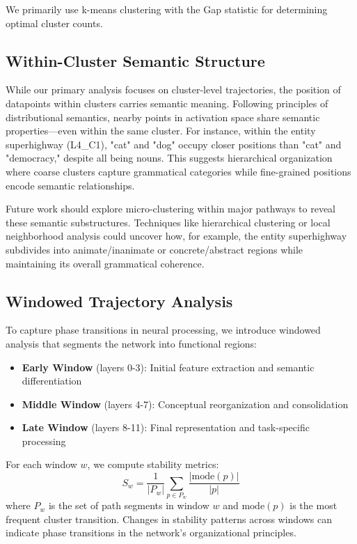 We primarily use k-means clustering with the Gap statistic for determining optimal cluster counts.

\subsection{Within-Cluster Semantic Structure}

While our primary analysis focuses on cluster-level trajectories, the position of datapoints within clusters carries semantic meaning. Following principles of distributional semantics, nearby points in activation space share semantic properties—even within the same cluster. For instance, within the entity superhighway (L4\_C1), "cat" and "dog" occupy closer positions than "cat" and "democracy," despite all being nouns. This suggests hierarchical organization where coarse clusters capture grammatical categories while fine-grained positions encode semantic relationships.

Future work should explore micro-clustering within major pathways to reveal these semantic substructures. Techniques like hierarchical clustering or local neighborhood analysis could uncover how, for example, the entity superhighway subdivides into animate/inanimate or concrete/abstract regions while maintaining its overall grammatical coherence.

\subsection{Windowed Trajectory Analysis}

To capture phase transitions in neural processing, we introduce windowed analysis that segments the network into functional regions:
\begin{itemize}
    \item \textbf{Early Window} (layers 0-3): Initial feature extraction and semantic differentiation
    \item \textbf{Middle Window} (layers 4-7): Conceptual reorganization and consolidation
    \item \textbf{Late Window} (layers 8-11): Final representation and task-specific processing
\end{itemize}

For each window $w$, we compute stability metrics:
$$S_w = \frac{1}{|P_w|} \sum_{p \in P_w} \frac{|\text{mode}(p)|}{|p|}$$
where $P_w$ is the set of path segments in window $w$ and $\text{mode}(p)$ is the most frequent cluster transition. Changes in stability patterns across windows can indicate phase transitions in the network's organizational principles.


